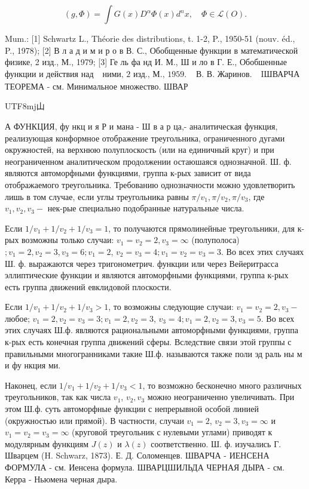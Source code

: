 \documentclass[10pt]{article}
\begin{document}
\[

(g, \Phi)=\int G(x) D^{\alpha} \Phi(x) d^{n} x, \quad \Phi \in \mathscr{L}(O) .

\]



Mum.: [1] Schwartz L., Théorie des distributions, t. 1-2, P., 1950-51 (nouv. éd., P., 1978); [2] В л а д и м и р о в В. С., Обобщенные функции в математической физике, 2 изд., М., 1979; [3] Ге ль фа нд И. М., Ш и ло в Г. Е., Обобшенные функции и действия над $\begin{array}{ll}\text { ними, } 2 \text { изд., М., } 1959 . & \text { В. В. Жаринов. }\end{array}$ IШВАРЧА ТЕОРЕМА - см. Минимальное множество. ШВАР\begin{CJK}{UTF8}{mj}山\end{CJK}А ФУНКЦИЯ, фу нкц и я Р и мана - Ш в а р ца,- аналитическая функция, реализующая конформное отображение треугольника, ограниченного дугами окружностей, на верхнюю полуплоскость (или на единичный круг) и при неограниченном аналитическом продолжении остаюшаяся однозначной. Ш. ф. являются автоморфными функциями, группа к-рых зависит от вида отображаемого треугольника. Требованию однозначности можно удовлетворить лишь в том случае, если углы треугольника равны $\pi / v_{1}, \pi / v_{2}, \pi / v_{3}$, где $v_{1}, v_{2}, v_{3}-$ нек-рые специально подобранные натуральные числа.



Если $1 / v_{1}+1 / v_{2}+1 / v_{3}=1$, то получаются прямолинейные треугольники, для к-рых возможны только случаи: $v_{1}=v_{2}=2, v_{3}=\infty$ (полуполоса) $; v_{1}=2, v_{2}=3, v_{3}=6 ; v_{1}=2$, $v_{2}=v_{3}=4 ; v_{1}=v_{2}=v_{3}=3$. Во всех этих случаях Ш. ф. выражаются через тригонометрич. функции или через Вейеритрасса эллиптические функции и являются автоморфными функциями, группа к-рых есть группа движений евклидовой плоскости.



Если $1 / v_{1}+1 / v_{2}+1 / v_{3}>1$, то возможны следующие случаи: $v_{1}=v_{2}=2, v_{3}-$ любое; $v_{1}=2, v_{2}=v_{3}=3 ; v_{1}=2, v_{2}=3$, $v_{3}=4 ; v_{1}=2, v_{2}=3, v_{3}=5$. Во всех этих случаях Ш.ф. являются рациональными автоморфными функциями, группа к-рых есть конечная группа движений сферы. Вследствие связи этой группы с правильными многогранниками такие Ш.ф. называются также поли эд раль ны м и фу нкция ми.



Наконец, если $1 / v_{1}+1 / v_{2}+1 / v_{3}<1$, то возможно бесконечно много различных треугольников, так как числа $v_{1}$, $v_{2}, v_{3}$ можно неограниченно увеличивать. При этом Ш.ф. суть автоморфные функции с непрерывной особой линией (окружностью или прямой). В частности, случаи $v_{1}=2$, $v_{2}=3, v_{3}=\infty$ и $v_{1}=v_{2}=v_{3}=\infty$ (круговой треугольник с нулевыми углами) приводят к модулярным функциям $J(z)$ и $\lambda(z)$ соответственно. Ш. ф. изучались Г. Шварцем (H. Schwarz, 1873). Е. Д. Соломенцев. ШВАРЧА - ИЕНСЕНА ФОРМУЛА - см. Иенсена формула. ШВАРЦШИЛЬДА ЧЕРНАЯ ДЫРА - см. Керра - Ньюмена черная дыра.
\end{document}
